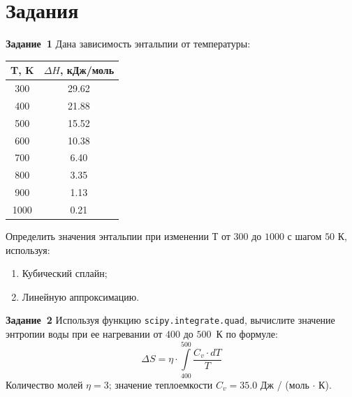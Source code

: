 \documentclass[aspectratio=169, mathserif]{beamer}%
\begin{document}
\section{Задания}
\sectionframe

\begin{frame}[fragile]{\textcolor{tpugreen}{\textbf{Задание~1}}}
\scriptsize
Дана зависимость энтальпии от температуры:
\vfill
\begin{table}
\begin{tabular}{|c|c|}
	\hline
	T, K & $\Delta H$, кДж/моль \\
	\hline
	300 & 29.62  \\
	\hline
	400 	& 21.88 \\
	\hline
	500    & 15.52 \\
	\hline
	600  & 10.38 \\
	\hline
	700  & 6.40 \\
	\hline
	800  & 3.35 \\
	\hline
	900  & 1.13 \\
	\hline
	1000  & 0.21 \\
	\hline
\end{tabular}
\end{table}
\vfill
Определить значения энтальпии при изменении $Т$ от $300$ до $1000$ с шагом $50$ К, используя:
\begin{enumerate}
	\item Кубический сплайн;
	\item Линейную аппроксимацию.
\end{enumerate}
\vfill
\end{frame}

\begin{frame}[fragile]{\textcolor{tpugreen}{\textbf{Задание~2}}}
\scriptsize
Используя функцию \texttt{scipy.integrate.quad}, вычислите значение энтропии воды при ее нагревании от $400$ до $500$~К по формуле:
	$$ \Delta S = \eta \cdot \int\limits_{400}^{500} \dfrac{C_v \cdot dT}{T} $$
Количество молей $\eta = 3$; значение теплоемкости $C_v = 35.0$ Дж / (моль $\cdot$ К).
\vfill
\end{frame}
\end{document}

